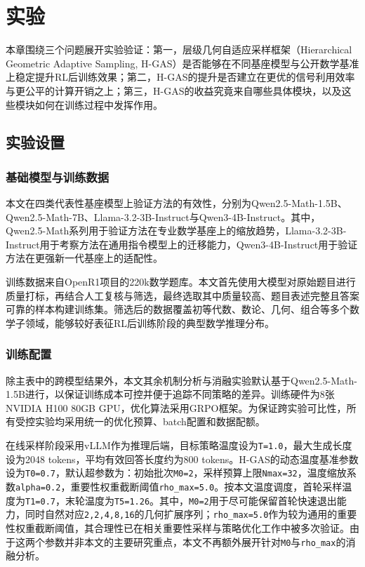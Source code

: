 \chapter{实验}
\label{chap:experiments}

本章围绕三个问题展开实验验证：第一，层级几何自适应采样框架（Hierarchical Geometric Adaptive Sampling, H-GAS）是否能够在不同基座模型与公开数学基准上稳定提升RL后训练效果；第二，H-GAS的提升是否建立在更优的信号利用效率与更公平的计算开销之上；第三，H-GAS的收益究竟来自哪些具体模块，以及这些模块如何在训练过程中发挥作用。

\section{实验设置}
\label{sec:exp_setup}

\subsection{基础模型与训练数据}
\label{subsec:exp_models_data}

本文在四类代表性基座模型上验证方法的有效性，分别为Qwen2.5-Math-1.5B、Qwen2.5-Math-7B、Llama-3.2-3B-Instruct与Qwen3-4B-Instruct。其中，Qwen2.5-Math系列用于验证方法在专业数学基座上的缩放趋势，Llama-3.2-3B-Instruct用于考察方法在通用指令模型上的迁移能力，Qwen3-4B-Instruct用于验证方法在更强新一代基座上的适配性。

训练数据来自OpenR1项目的220k数学题库。本文首先使用大模型对原始题目进行质量打标，再结合人工复核与筛选，最终选取其中质量较高、题目表述完整且答案可靠的样本构建训练集。筛选后的数据覆盖初等代数、数论、几何、组合等多个数学子领域，能够较好表征RL后训练阶段的典型数学推理分布。

\subsection{训练配置}
\label{subsec:exp_configuration}

除主表中的跨模型结果外，本文其余机制分析与消融实验默认基于Qwen2.5-Math-1.5B进行，以保证训练成本可控并便于追踪不同策略的差异。训练硬件为8张NVIDIA H100 80GB GPU，优化算法采用GRPO框架。为保证跨实验可比性，所有受控实验均采用统一的优化预算、batch配置和数据配额。

在线采样阶段采用vLLM作为推理后端，目标策略温度设为\texttt{T=1.0}，最大生成长度设为2048 tokens，平均有效回答长度约为800 tokens。H-GAS的动态温度基准参数设为\texttt{T0=0.7}，默认超参数为：初始批次\texttt{M0=2}，采样预算上限\texttt{Nmax=32}，温度缩放系数\texttt{alpha=0.2}，重要性权重截断阈值\texttt{rho\_max=5.0}。按本文温度调度，首轮采样温度为\texttt{T1=0.7}，末轮温度为\texttt{T5=1.26}。其中，\texttt{M0=2}用于尽可能保留首轮快速退出能力，同时自然对应\texttt{2,2,4,8,16}的几何扩展序列；\texttt{rho\_max=5.0}作为较为通用的重要性权重截断阈值，其合理性已在相关重要性采样与策略优化工作中被多次验证。由于这两个参数并非本文的主要研究重点，本文不再额外展开针对\texttt{M0}与\texttt{rho\_max}的消融分析。

